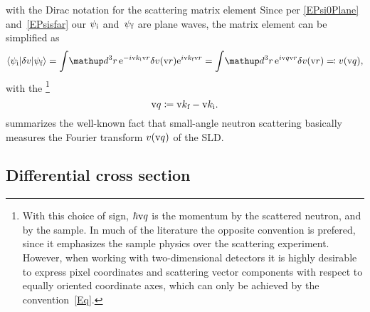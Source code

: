 with the Dirac notation for the scattering matrix element
%
%
%
Since per \cref{EPsi0Plane} and~\cref{EPsisfar} our $\psi_\si$ and~$\psi_\sf$ are plane waves,
the matrix element can be simplified as
\begin{equation}\label{Echiq}
  \bra \psi_\si|\delta v|\psi_\sf\ket
  = \int\!\d^3r\, {\rm e}^{-i\k_\si\r}\delta v(\r){\rm e}^{i\k_\sf\r}
  = \int\!\d^3r\, {\rm e}^{i\q\r}\delta v(\r)
  \eqqcolon v(\q),
\end{equation}
%
with the \footnote
{With this choice of sign,
%
$\hbar\q$ is the momentum
%
 by the scattered neutron,
and  by the sample.
In much of the literature the opposite convention is prefered,
since it emphasizes the sample physics over the scattering experiment.
However, when working with two-dimensional detectors
it is highly desirable to express pixel coordinates
and scattering vector components
with respect to equally oriented coordinate axes,
which can only be achieved by the convention~\cref{Eq}.}
%
\begin{equation}\label{Eq}
  \q\coloneqq \k_\sf-\k_\si.
\end{equation}
%
 summarizes the well-known fact that
small-angle neutron scattering basically measures
the Fourier transform $v(\q)$ of the SLD.
%
%

%


\subsection{Differential cross section}\label{SdiffCross}

